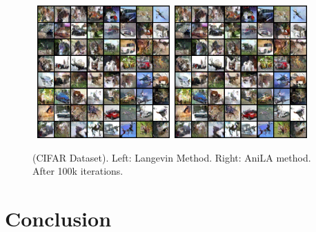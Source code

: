 \documentclass{article}
\begin{document}
\begin{figure}[H]
    \begin{center}
        \mbox{
        \includegraphics[width=2in]{figs/cifarlangevin}
        \includegraphics[width=2in]{figs/cifarlangevin}
        }
    \end{center}
    \vspace{-0.1in}
	\caption{(CIFAR Dataset). Left: Langevin Method. Right: AniLA method. After 100k iterations.}
	\label{fig:cifar}
\end{figure}


\section{Conclusion}\label{sec:conclusion}

\newpage



\end{document}
